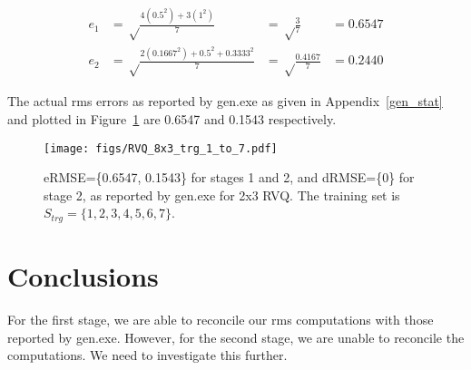\begin{equation}
\begin{array}{lllll}
e_1 &= \sqrt \frac{4(0.5^2) + 3(1^2)}{7} &= \sqrt\frac{3}{7} &= 0.6547 \\
e_2 &= \sqrt \frac{2(0.1667^2) + 0.5^2 + 0.3333^2}{7} &= \sqrt\frac{0.4167}{7} &= 0.2440 
\end{array}
\end{equation}

The actual rms errors as reported by gen.exe as given in Appendix~\ref{gen_stat} and plotted in Figure~\ref{fig:RVQ_8x3_trg_1_to_7} are 0.6547 and 0.1543 respectively.

\begin{table}[t]
\centering
{}
\caption{RVQ reconstruction error using 2x3 \emph{encoder} codebook.}
\label{table:encoder_recon}
\end{table}

								\begin{figure}
								\centering
								\texttt{[image: figs/RVQ\_8x3\_trg\_1\_to\_7.pdf]}
								\caption{eRMSE=\{0.6547, 0.1543\} for stages 1 and 2, and dRMSE=\{0\} for stage 2, as reported by gen.exe for 2x3 RVQ.  The training set is $S_{trg}=\{1,2,3,4,5,6,7\}$.}
								\label{fig:RVQ_8x3_trg_1_to_7}
								\end{figure}


\section{Conclusions}
For the first stage, we are able to reconcile our rms computations with those reported by gen.exe.  However, for the second stage, we are unable to reconcile the computations.  We need to investigate this further.

